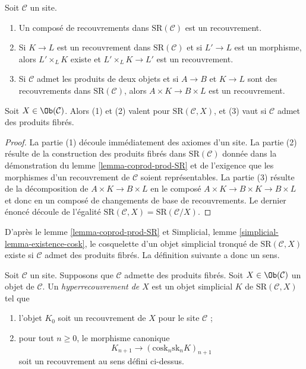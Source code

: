 \begin{lemma}
\label{lemma-covering-permanence}
Soit $\mathcal{C}$ un site.
\begin{enumerate}
\item Un composé de recouvrements dans $\text{SR}(\mathcal{C})$
est un recouvrement.
\item Si $K \to L$ est un recouvrement dans $\text{SR}(\mathcal{C})$
et si $L' \to L$ est un morphisme, alors $L' \times_L K$ existe
et $L' \times_L K \to L'$ est un recouvrement.
\item Si $\mathcal{C}$ admet les produits de deux objets et si
$A \to B$ et $K \to L$ sont des recouvrements dans $\text{SR}(\mathcal{C})$,
alors $A \times K \to B \times L$ est un recouvrement.
\end{enumerate}
Soit $X \in \Ob(\mathcal{C})$. Alors (1) et (2) valent pour
$\text{SR}(\mathcal{C}, X)$, et (3) vaut si $\mathcal{C}$
admet des produits fibrés.
\end{lemma}

\begin{proof}
La partie (1) découle immédiatement des axiomes d'un site.
La partie (2) résulte de la construction des produits fibrés
dans $\text{SR}(\mathcal{C})$ donnée dans la démonstration du
lemme \ref{lemma-coprod-prod-SR}
et de l'exigence que les morphismes d'un recouvrement
de $\mathcal{C}$ soient représentables.
La partie (3) résulte de la décomposition de $A \times K \to B \times L$
en le composé $A \times K \to B \times K \to B \times L$
et donc en un composé de changements de base de recouvrements.
Le dernier énoncé découle de l'égalité $\text{SR}(\mathcal{C}, X) =
\text{SR}(\mathcal{C}/X)$.
\end{proof}

\noindent
D'après le lemme \ref{lemma-coprod-prod-SR} et
Simplicial, lemme \ref{simplicial-lemma-existence-cosk},
le cosquelette d'un objet simplicial tronqué de
$\text{SR}(\mathcal{C}, X)$ existe si $\mathcal{C}$ admet des produits fibrés.
La définition suivante a donc un sens.

\begin{definition}
\label{definition-hypercovering}
Soit $\mathcal{C}$ un site. Supposons que $\mathcal{C}$ admette des produits fibrés.
Soit $X \in \Ob(\mathcal{C})$ un objet de $\mathcal{C}$.
Un {\it hyperrecouvrement de $X$} est un objet simplicial
$K$ de $\text{SR}(\mathcal{C}, X)$ tel que
\begin{enumerate}
\item l'objet $K_0$ soit un recouvrement de $X$ pour le site $\mathcal{C}$ ;
\item pour tout $n \geq 0$, le morphisme canonique
$$
K_{n + 1} \longrightarrow (\text{cosk}_n \text{sk}_n K)_{n + 1}
$$
soit un recouvrement au sens défini ci-dessus.
\end{enumerate}
\end{definition}

